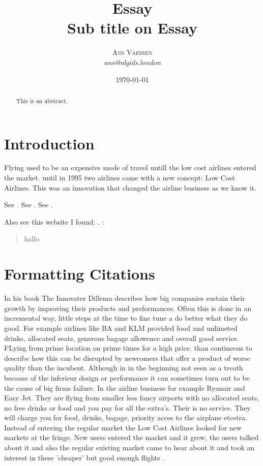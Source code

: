 \documentclass[a4paper, 11pt]{article}
\title{\textbf{Essay}\\Sub title on Essay}
\author{\textsc{Ans Vaessen}
\\{\textit{ans@nlgids.london}}}
\date{\today}
\begin{document}
 
\maketitle 

\begin{abstract}
This is an abstract.
\end{abstract}

\vspace{30pt} %

\section*{Introduction}

Flying used to be an expensive mode of travel untill the low cost airlines entered the market. until in 1995 two airlines came with a new concept: Low Cost Airlines. This was an innovation that changed the airline business as we know it. 


See \cite{Christensen97}.
See \citep{Christensen97}.
See \citep[p. 145]{Christensen97}.

Also see this website I found: \cite{TripAdvisor}.
:
\begin{quote}
hallo
\end{quote}

\section{Formatting Citations}
In his book The Innovater Dillema \cite{Christensen97} describes how big companies sustain their growth by improving their products and preformances. Often this is done in an incremental way, little steps at the time to fine tune a do better what they do good. For example airlines like BA and KLM provided food and unlimeted drinks, allocated seats, generous bagage allowence and overall good service. FLying from prime location on prime times for a high price.\cite{Christensen97} than contineous to describe how this can be disrupted by newcomers that offer a product of worse quality than the incubent. Although in in the beginning not seen as a treath because of the inferieur design or performance it can sometimes turn out to be the cause of big firms failure.  
In the airline business for example Ryanair and Easy Jet. They are flying from smaller less fancy airports with no allocated seats, no free drinks or food and you pay for all the extra's. Their is no service. They will charge you for food, drinks, bagage, priority acces to the airplane etcetra. 
Instead of entering the regular market the Low Cost Airlines looked for new markets at the fringe. New users entered the market and it grew, the users talked about it and also the regular existing market came to hear about it and took an interest in these 'cheaper' but good enough flights \citep{TiddBessant}. 
\end{document}
